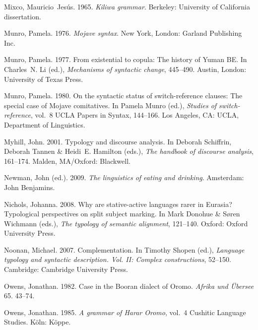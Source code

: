 \documentclass[ number=1
			   ,series=sidl
				,url=http://langsci-press.org/catalog/book/18 
			   ,isbn=978-3-944675-19-0
			   ,output=long   %
			  ]{LSP/langsci}
\begin{document}
\begin{thebibliography}{190}
Mixco, Mauricio~Jes{\'u}s. 1965.
\newblock \emph{{K}iliwa grammar}.
\newblock Berkeley: University of California dissertation.

Munro, Pamela. 1976.
\newblock \emph{{M}ojave syntax}.
\newblock New York, London: Garland Publishing Inc.

Munro, Pamela. 1977.
\newblock From existential to copula: The history of {Y}uman {BE}.
\newblock In {\relax Ch}arles~N. Li (ed.), \emph{Mechanisms of syntactic
  change}, 445--490. Austin, London: University of Texas Press.

Munro, Pamela. 1980.
\newblock On the syntactic status of switch-reference clauses: {T}he special
  case of {M}ojave comitatives.
\newblock In Pamela Munro (ed.), \emph{Studies of switch-reference}, vol.~8
  UCLA Papers in Syntax, 144--166. Los Angeles, CA: UCLA, Department of
  Linguistics.

Myhill, John. 2001.
\newblock Typology and discourse analysis.
\newblock In Deborah Schiffrin, Deborah Tannen \& Heidi~E. Hamilton (eds.),
  \emph{The handbook of discourse analysis}, 161--174. Malden, MA/Oxford:
  Blackwell.

Newman, John (ed.). 2009.
\newblock \emph{The linguistics of eating and drinking}.
\newblock Amsterdam: John Benjamins.

Nichols, Johanna. 2008.
\newblock Why are stative-active languages rarer in {E}urasia? {T}ypological
  perspectives on split subject marking.
\newblock In Mark Donohue \& S{\o}ren Wichmann (eds.), \emph{The typology of
  semantic alignment}, 121--140. Oxford: Oxford University Press.

Noonan, Michael. 2007.
\newblock Complementation.
\newblock In Timothy Shopen (ed.), \emph{Language typology and syntactic
  description. {V}ol. {II}: {C}omplex constructions}, 52--150. Cambridge:
  Cambridge University Press.

Owens, Jonathan. 1982.
\newblock Case in the {B}ooran dialect of {O}romo.
\newblock \emph{Afrika und {\"U}bersee} 65. 43--74.

Owens, Jonathan. 1985.
\newblock \emph{A grammar of {H}arar {O}romo}, vol.~4 Cushitic Language
  Studies.
\newblock K{\"o}ln: K{\"o}ppe.


\end{thebibliography}
\end{document}

